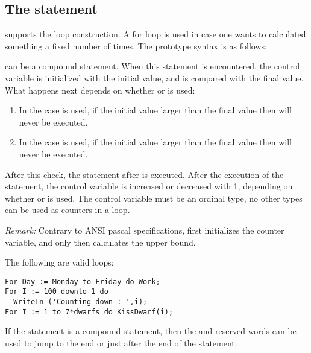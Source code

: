 \documentclass{report}
\begin{document}
\subsection{The  statement}
\fpc supports the  loop construction. A for loop is used in case
one wants to calculated something a fixed number of times.
The prototype syntax is as follows:

 can be a compound statement.
When this statement is encountered, the control variable is initialized with
the initial value, and is compared with the final value.
What happens next depends on whether  or  is used:
\begin{enumerate}
\item In the case  is used, if the initial value larger than the final
value then  will never be executed.
\item In the case  is used, if the initial value larger than the final
value then  will never be executed.
\end{enumerate}
After this check, the statement after  is executed. After the
execution of the statement, the control variable is increased or decreased
with 1, depending on whether  or  is used.
The control variable must be an ordinal type, no other
types can be used as counters in a loop.

{\em Remark:} Contrary to ANSI pascal specifications, \fpc first initializes
the counter variable, and only then calculates the upper bound.

The following are valid loops:
\begin{verbatim}
For Day := Monday to Friday do Work;
For I := 100 downto 1 do
  WriteLn ('Counting down : ',i);
For I := 1 to 7*dwarfs do KissDwarf(i);
\end{verbatim}

If the statement is a compound statement, then  the  and 
 reserved words can be used to jump to the end or just 
after the end of the  statement.
\end{document}
